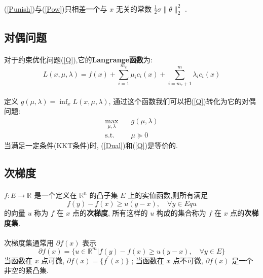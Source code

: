 \documentclass[UTF8]{ctexart}
\renewcommand{\b}{\textbf}
\newcommand{\equSplit}[1]{\begin{equation}\begin{split}#1\end{split}\end{equation}}
\newcommand{\equ}[1]{\begin{equation}#1\end{equation}}
\newcommand{\Tst}{\text{s.t.}\quad}
\newcommand{\norm}[1]{\lVert#1\rVert}
\newcommand{\Real}[1]{\mathbb{R}^{#1}}
\numberwithin{equation}{section}
\begin{document}
			\paragraph{}
				\quad (\ref{Punish})与(\ref{Pow})只相差一个与 $x$ 无关的常数 $\frac{1}{2} \sigma \norm{\theta}^2_2$ .

		\subsection{对偶问题}
			\paragraph{}
				\quad 对于约束优化问题(\ref{Q}),它的\b{Langrange函数}为:
				\equ{
						L(x, \mu, \lambda)
					=	f(x) + \sum^{m_e}_{i = 1} \mu_i c_i(x) + \sum^{m}_{i = m_e + 1} \lambda_i c_i(x)
				}

			\paragraph{}
				\quad 定义 $g(\mu, \lambda) = \inf_x L(x, \mu, \lambda)$, 通过这个函数我们可以把(\ref{Q})转化为它的对偶问题:
				\equSplit{\label{Dual}
					\max_{\mu, \lambda} \quad
						& g(\mu,\lambda)\\
					\Tst
						& \mu \succeq 0
				}
				当满足一定条件(KKT条件)时, (\ref{Dual})和(\ref{Q})是等价的.

		\subsection{次梯度}
			\paragraph{}
				\quad $f: E \rightarrow \Real{}$ 是一个定义在 $\Real{n}$ 的凸子集 $E$ 上的实值函数,则所有满足
				\equ{
					f(y) - f(x) \geq u(y-x), \quad \forall y \in E
				qu}
				的向量 $u$ 称为 $f$ 在 $x$ 点的\b{次梯度}, 所有这样的 $u$ 构成的集合称为 $f$ 在 $x$ 点的\b{次梯度集}.

			\paragraph{}
				\quad 次梯度集通常用 $\partial f(x)$ 表示
				\equ{
						\partial f(x)
					=	\{u \in \Real{m} \vert f(y) - f(x) \geq u(y - x), \quad \forall y \in E\}
				}
				当函数在 $x$ 点可微, $\partial f(x) = \{f^\prime(x)\}$ ; 当函数在 $x$ 点不可微, $\partial f(x)$ 是一个非空的紧凸集.
\end{document}

